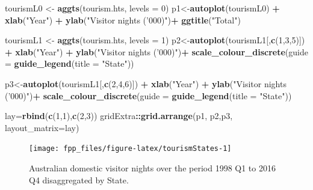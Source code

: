 \documentclass[]{book}
\newenvironment{Shaded}{\begin{snugshade}}{\end{snugshade}}
\newcommand{\DataTypeTok}[1]{\textcolor[rgb]{0.13,0.29,0.53}{#1}}
\newcommand{\DecValTok}[1]{\textcolor[rgb]{0.00,0.00,0.81}{#1}}
\newcommand{\KeywordTok}[1]{\textcolor[rgb]{0.13,0.29,0.53}{\textbf{#1}}}
\newcommand{\NormalTok}[1]{#1}
\newcommand{\OperatorTok}[1]{\textcolor[rgb]{0.81,0.36,0.00}{\textbf{#1}}}
\newcommand{\StringTok}[1]{\textcolor[rgb]{0.31,0.60,0.02}{#1}}
\begin{document}
\begin{Shaded}
\begin{Highlighting}[]
\NormalTok{tourismL0 <-}\StringTok{ }\KeywordTok{aggts}\NormalTok{(tourism.hts, }\DataTypeTok{levels =} \DecValTok{0}\NormalTok{)}
\NormalTok{p1<-}\KeywordTok{autoplot}\NormalTok{(tourismL0) }\OperatorTok{+}
\StringTok{  }\KeywordTok{xlab}\NormalTok{(}\StringTok{"Year"}\NormalTok{) }\OperatorTok{+}
\StringTok{  }\KeywordTok{ylab}\NormalTok{(}\StringTok{"Visitor nights ('000)"}\NormalTok{)}\OperatorTok{+}
\StringTok{  }\KeywordTok{ggtitle}\NormalTok{(}\StringTok{"Total"}\NormalTok{)}

\NormalTok{tourismL1 <-}\StringTok{ }\KeywordTok{aggts}\NormalTok{(tourism.hts, }\DataTypeTok{levels =} \DecValTok{1}\NormalTok{)}
\NormalTok{p2<-}\KeywordTok{autoplot}\NormalTok{(tourismL1[,}\KeywordTok{c}\NormalTok{(}\DecValTok{1}\NormalTok{,}\DecValTok{3}\NormalTok{,}\DecValTok{5}\NormalTok{)]) }\OperatorTok{+}\StringTok{ }
\StringTok{  }\KeywordTok{xlab}\NormalTok{(}\StringTok{"Year"}\NormalTok{) }\OperatorTok{+}
\StringTok{  }\KeywordTok{ylab}\NormalTok{(}\StringTok{"Visitor nights ('000)"}\NormalTok{)}\OperatorTok{+}
\StringTok{  }\KeywordTok{scale_colour_discrete}\NormalTok{(}\DataTypeTok{guide =} \KeywordTok{guide_legend}\NormalTok{(}\DataTypeTok{title =} \StringTok{"State"}\NormalTok{))}
 
\NormalTok{p3<-}\KeywordTok{autoplot}\NormalTok{(tourismL1[,}\KeywordTok{c}\NormalTok{(}\DecValTok{2}\NormalTok{,}\DecValTok{4}\NormalTok{,}\DecValTok{6}\NormalTok{)]) }\OperatorTok{+}\StringTok{ }
\StringTok{  }\KeywordTok{xlab}\NormalTok{(}\StringTok{"Year"}\NormalTok{) }\OperatorTok{+}
\StringTok{  }\KeywordTok{ylab}\NormalTok{(}\StringTok{"Visitor nights ('000)"}\NormalTok{)}\OperatorTok{+}
\StringTok{  }\KeywordTok{scale_colour_discrete}\NormalTok{(}\DataTypeTok{guide =} \KeywordTok{guide_legend}\NormalTok{(}\DataTypeTok{title =} \StringTok{"State"}\NormalTok{))}

\NormalTok{lay=}\KeywordTok{rbind}\NormalTok{(}\KeywordTok{c}\NormalTok{(}\DecValTok{1}\NormalTok{,}\DecValTok{1}\NormalTok{),}\KeywordTok{c}\NormalTok{(}\DecValTok{2}\NormalTok{,}\DecValTok{3}\NormalTok{))}
\NormalTok{gridExtra}\OperatorTok{::}\KeywordTok{grid.arrange}\NormalTok{(p1, p2,p3, }\DataTypeTok{layout_matrix=}\NormalTok{lay)}
\end{Highlighting}
\end{Shaded}

\begin{figure}

{\centering \texttt{[image: fpp\_files/figure-latex/tourismStates-1]} 

}

\caption{Australian domestic visitor nights over the period 1998 Q1 to 2016 Q4 disaggregated by State.}\label{fig:tourismStates}
\end{figure}
\end{document}
